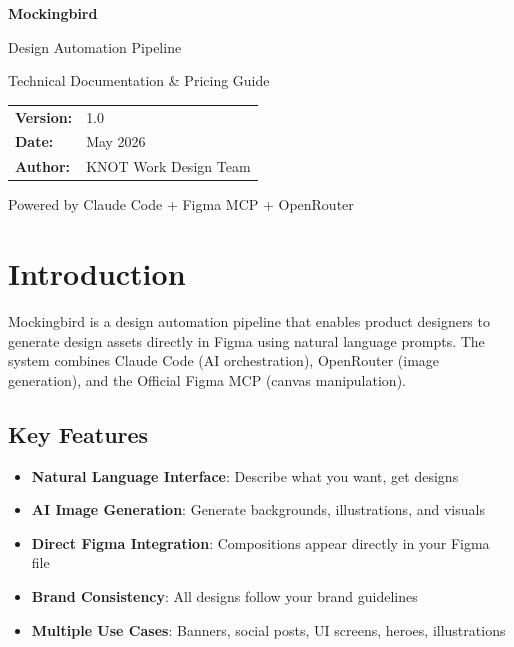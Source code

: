 \documentclass[11pt,a4paper]{article}
\begin{document}
\begin{titlepage}
    \centering
    \vspace*{2cm}

    {\Huge\bfseries\textcolor{primary}{Mockingbird}\par}
    \vspace{0.5cm}
    {\Large Design Automation Pipeline\par}

    \vspace{2cm}

    {\large\textcolor{secondary}{Technical Documentation \& Pricing Guide}\par}

    \vspace{3cm}

    \begin{tabular}{ll}
        \textbf{Version:} & 1.0 \\
        \textbf{Date:} & May 2026 \\
        \textbf{Author:} & KNOT Work Design Team \\
    \end{tabular}

    \vfill

    {\small Powered by Claude Code + Figma MCP + OpenRouter\par}
\end{titlepage}

\tableofcontents
\newpage

\section{Introduction}

Mockingbird is a design automation pipeline that enables product designers to generate design assets directly in Figma using natural language prompts. The system combines Claude Code (AI orchestration), OpenRouter (image generation), and the Official Figma MCP (canvas manipulation).

\subsection{Key Features}
\begin{itemize}
    \item \textbf{Natural Language Interface}: Describe what you want, get designs
    \item \textbf{AI Image Generation}: Generate backgrounds, illustrations, and visuals
    \item \textbf{Direct Figma Integration}: Compositions appear directly in your Figma file
    \item \textbf{Brand Consistency}: All designs follow your brand guidelines
    \item \textbf{Multiple Use Cases}: Banners, social posts, UI screens, heroes, illustrations
\end{itemize}
\end{document}
